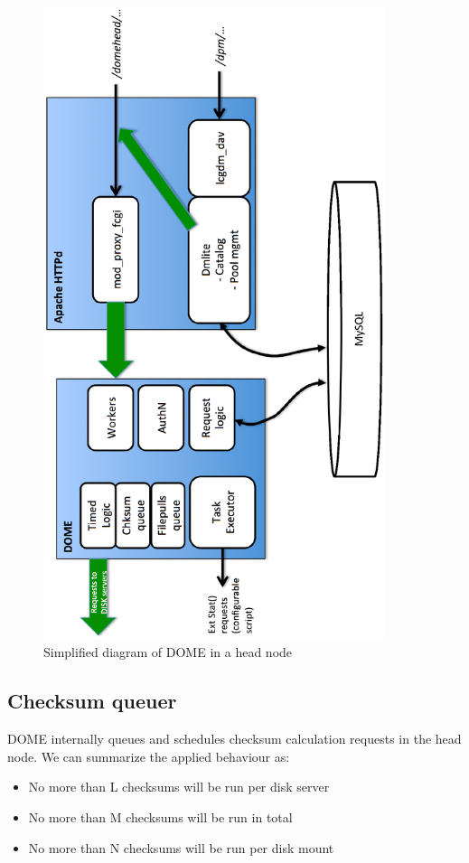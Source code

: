 \documentclass[a4paper]{jpconf}
\begin{document}
\begin{figure}
\begin{center}
 \includegraphics[width=10cm,keepaspectratio=true,angle=-90,origin=c]{./pics/domepics_head.eps}
 \caption{Simplified diagram of DOME in a head node}
 \label{figdomehead}
\end{center}

\end{figure}

\subsection{Checksum queuer}
 DOME internally queues and schedules checksum calculation requests in the head node. We can summarize the applied behaviour as:
 \begin{itemize}
  \item No more than L checksums will be run per disk server\\
  \item No more than M checksums will be run in total\\
  \item No more than N checksums will be run per disk mount\\
 \end{itemize}
 
\end{document}
